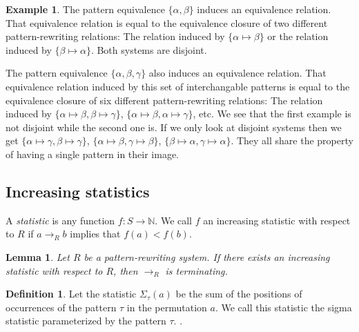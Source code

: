 \documentclass[a4paper, 11pt, english]{article}
\newcommand{\patternrule}{ \mapsto \!}
\newtheorem{lemma}[theorem]{Lemma}
\theoremstyle{definition}
\newtheorem{definition}[theorem]{Definition}
\newtheorem{example}[theorem]{Example}
\newcommand{\Sym}{S}
\begin{document}
\begin{example}
  The pattern equivalence $\{ \alpha, \beta \}$ induces an equivalence relation.
  That equivalence relation is equal to the equivalence closure of two different pattern-rewriting
  relations: The relation induced by $\{ \alpha \patternrule \beta \}$ or the relation induced by
  $\{ \beta \patternrule \alpha \}$. Both systems are disjoint.

  The pattern equivalence $\{ \alpha, \beta, \gamma \}$ also induces an equivalence relation.
  That equivalence relation induced by this set of interchangable patterns is equal to the
  equivalence closure of six different pattern-rewriting
  relations: The relation induced by $\{ \alpha \patternrule \beta, \beta \patternrule \gamma \}$,
  $\{ \alpha \patternrule \beta, \alpha \patternrule \gamma \}$, etc. We see that the first example is
  not disjoint while the second one is. If we only look at disjoint systems then we get
  $\{ \alpha \patternrule \gamma, \beta \patternrule \gamma \}$,
  $\{ \alpha \patternrule \beta, \gamma \patternrule \beta \}$,
  $\{ \beta \patternrule \alpha, \gamma \patternrule \alpha \}$.
  They all share the property of having a single pattern in their image.
\end{example}

\subsection{Increasing statistics}
A \emph{statistic} is any function $f : \Sym \to \mathbb{N}$. We call $f$ an increasing
statistic with respect to $R$ if $a \to_R b$ implies that $f(a) < f(b)$.

\begin{lemma}
    Let $R$ be a pattern-rewriting system. If there exists an increasing
    statistic with respect to $R$, then $\to_R$ is terminating.    
\end{lemma}

\begin{definition}
    Let the statistic $\Sigma_\tau(a)$ be the sum of the positions of occurrences of
    the pattern $\tau$ in the permutation $a$. We call this statistic the sigma statistic
    parameterized by the pattern $\tau$.
    \cite{claesson:2021}.
\end{definition}
\end{document}
